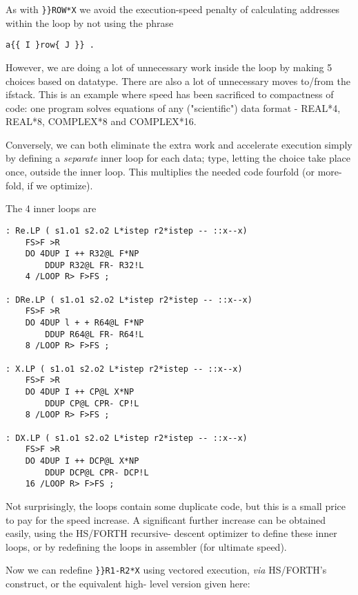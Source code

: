As with \verb|}}ROW*X| we avoid the execution-speed penalty of
calculating addresses within the loop by not using the phrase
\begin{verbatim}
a{{ I }row{ J }} .
\end{verbatim}
However, we are doing a lot of unnecessary work inside the loop
by making 5 choices based on datatype. There are also a lot of
unnecessary moves to/from the ifstack. This is an example where
speed has been sacrificed to compactness of code: one program
solves equations of any ("scientific") data format - REAL*4,
REAL*8, COMPLEX*8 and COMPLEX*16. 

Conversely, we can both eliminate the extra work and accelerate
execution simply by defining a \textit{separate} inner loop for each data;
type, letting the choice take place once, outside the inner loop.
This multiplies the needed code fourfold (or more-fold, if we
optimize).

The 4 inner loops are
\begin{verbatim}
: Re.LP ( s1.o1 s2.o2 L*istep r2*istep -- ::x--x)
    FS>F >R
    DO 4DUP I ++ R32@L F*NP
        DDUP R32@L FR- R32!L
    4 /LOOP R> F>FS ;

: DRe.LP ( s1.o1 s2.o2 L*istep r2*istep -- ::x--x)
    FS>F >R
    DO 4DUP l + + R64@L F*NP
        DDUP R64@L FR- R64!L
    8 /LOOP R> F>FS ;

: X.LP ( s1.o1 s2.o2 L*istep r2*istep -- ::x--x)
    FS>F >R
    DO 4DUP I ++ CP@L X*NP
        DDUP CP@L CPR- CP!L
    8 /LOOP R> F>FS ;

: DX.LP ( s1.o1 s2.o2 L*istep r2*istep -- ::x--x)
    FS>F >R
    DO 4DUP I ++ DCP@L X*NP
        DDUP DCP@L CPR- DCP!L
    16 /LOOP R> F>FS ;
\end{verbatim} 
Not surprisingly, the loops contain some duplicate code, but this
is a small price to pay for the speed increase. A significant further
increase can be obtained easily, using the HS/FORTH recursive-
descent optimizer to define these inner loops, or by redefining
the loops in assembler (for ultimate speed).

Now we can redefine \verb|}}R1-R2*X| using vectored execution, \textit{via}
HS/FORTH's  construct, or the equivalent high-
level version given here:

